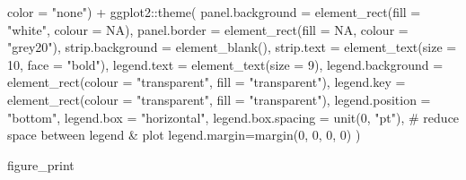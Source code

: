 \documentclass[
  letterpaper,
  oneside,
  open=any]{scrbook}
\newenvironment{Shaded}{\begin{snugshade}}{\end{snugshade}}
\newcommand{\AttributeTok}[1]{\textcolor[rgb]{0.40,0.45,0.13}{#1}}
\newcommand{\CommentTok}[1]{\textcolor[rgb]{0.37,0.37,0.37}{#1}}
\newcommand{\ConstantTok}[1]{\textcolor[rgb]{0.56,0.35,0.01}{#1}}
\newcommand{\DecValTok}[1]{\textcolor[rgb]{0.68,0.00,0.00}{#1}}
\newcommand{\FunctionTok}[1]{\textcolor[rgb]{0.28,0.35,0.67}{#1}}
\newcommand{\NormalTok}[1]{\textcolor[rgb]{0.00,0.23,0.31}{#1}}
\newcommand{\SpecialCharTok}[1]{\textcolor[rgb]{0.37,0.37,0.37}{#1}}
\newcommand{\StringTok}[1]{\textcolor[rgb]{0.13,0.47,0.30}{#1}}
\begin{document}
\begin{Shaded}
\begin{Highlighting}[]
    \AttributeTok{color =} \StringTok{"none"}\NormalTok{) }\SpecialCharTok{+}
\NormalTok{  ggplot2}\SpecialCharTok{::}\FunctionTok{theme}\NormalTok{( }
    \AttributeTok{panel.background =} \FunctionTok{element\_rect}\NormalTok{(}\AttributeTok{fill =} \StringTok{"white"}\NormalTok{, }\AttributeTok{colour =} \ConstantTok{NA}\NormalTok{), }
    \AttributeTok{panel.border =} \FunctionTok{element\_rect}\NormalTok{(}\AttributeTok{fill =} \ConstantTok{NA}\NormalTok{, }\AttributeTok{colour =} \StringTok{"grey20"}\NormalTok{), }
    \AttributeTok{strip.background =} \FunctionTok{element\_blank}\NormalTok{(), }
    \AttributeTok{strip.text =} \FunctionTok{element\_text}\NormalTok{(}\AttributeTok{size =} \DecValTok{10}\NormalTok{, }\AttributeTok{face =} \StringTok{"bold"}\NormalTok{), }
    \AttributeTok{legend.text =} \FunctionTok{element\_text}\NormalTok{(}\AttributeTok{size =} \DecValTok{9}\NormalTok{),}
    \AttributeTok{legend.background =} \FunctionTok{element\_rect}\NormalTok{(}\AttributeTok{colour =} \StringTok{"transparent"}\NormalTok{, }
                                     \AttributeTok{fill =} \StringTok{"transparent"}\NormalTok{),}
    \AttributeTok{legend.key =} \FunctionTok{element\_rect}\NormalTok{(}\AttributeTok{colour =} \StringTok{"transparent"}\NormalTok{, }
                              \AttributeTok{fill =} \StringTok{"transparent"}\NormalTok{),}
    \AttributeTok{legend.position =} \StringTok{"bottom"}\NormalTok{, }
    \AttributeTok{legend.box =} \StringTok{"horizontal"}\NormalTok{,}
    \AttributeTok{legend.box.spacing =} \FunctionTok{unit}\NormalTok{(}\DecValTok{0}\NormalTok{, }\StringTok{"pt"}\NormalTok{), }\CommentTok{\# reduce space between legend \& plot}
    \AttributeTok{legend.margin=}\FunctionTok{margin}\NormalTok{(}\DecValTok{0}\NormalTok{, }\DecValTok{0}\NormalTok{, }\DecValTok{0}\NormalTok{, }\DecValTok{0}\NormalTok{) )}

\NormalTok{figure\_print}
\end{Highlighting}
\end{Shaded}
\end{document}
